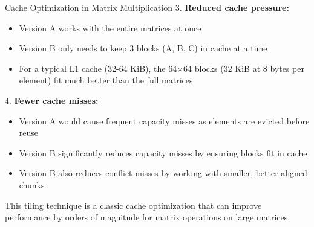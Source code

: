 \begin{example2}{Cache Optimization in Matrix Multiplication}
3. \textbf{Reduced cache pressure:}
   \begin{itemize}
     \item Version A works with the entire matrices at once
     \item Version B only needs to keep 3 blocks (A, B, C) in cache at a time
     \item For a typical L1 cache (32-64 KiB), the 64×64 blocks (32 KiB at 8 bytes per element) fit much better than the full matrices
   \end{itemize}

4. \textbf{Fewer cache misses:}
   \begin{itemize}
     \item Version A would cause frequent capacity misses as elements are evicted before reuse
     \item Version B significantly reduces capacity misses by ensuring blocks fit in cache
     \item Version B also reduces conflict misses by working with smaller, better aligned chunks
   \end{itemize}

This tiling technique is a classic cache optimization that can improve performance by orders of magnitude for matrix operations on large matrices.
\end{example2}